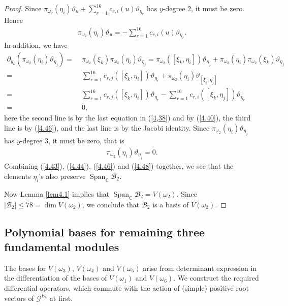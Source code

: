 \documentclass[12pt]{article}
\numberwithin{equation}{section}
\theoremstyle{definition}
\theoremstyle{remark}
\begin{document}
\begin{proof}
    Since $\pi_{\omega_2}(\eta_i)\vartheta_u+\sum_{r=1}^{16}c_{r,i}(u)\vartheta_{\eta_r}$ has $y$-degree $2$, it must be zero. Hence
    \begin{eqnarray}
    	\pi_{\omega_2}(\eta_i)\vartheta_u=-\sum_{r=1}^{16}c_{r,i}(u)\vartheta_{\eta_r}. \label{4.46}
    \end{eqnarray}
    In addition, we have
    \begin{align}
    	\partial_{y_k}(\pi_{\omega_2}(\eta_i)\vartheta_{\eta_j})=&\;\pi_{\omega_2}(\xi_k)\pi_{\omega_2}(\eta_i)\vartheta_{\eta_j}=\pi_{\omega_2}([\xi_k,\eta_i])\vartheta_{\eta_j}+\pi_{\omega_2}(\eta_i)\pi_{\omega_2}(\xi_k)\vartheta_{\eta_j}\nonumber\\
    	=&\;\sum_{r=1}^{16}c_{r,j}([\xi_k,\eta_i])\vartheta_{\eta_r}+\pi_{\omega_2}(\eta_i)\vartheta_{[\xi_k,\eta_j]}\nonumber\\
    	=&\;\sum_{r=1}^{16}c_{r,j}([\xi_k,\eta_i])\vartheta_{\eta_r}-\sum_{r=1}^{16}c_{r,i}([\xi_k,\eta_j])\vartheta_{\eta_r}\nonumber\\
    	=&\;0, 
    \end{align}
    here the second line is by the last equation in (\ref{4,38}) and by (\ref{4.40}), the third line is by (\ref{4.46}), and the last line is by the Jacobi identity. Since $\pi_{\omega_2}(\eta_i)\vartheta_{\eta_j}$ has $y$-degree $3$, it must be zero, that is
    \begin{eqnarray}
    	\pi_{\omega_2}(\eta_i)\vartheta_{\eta_j}=0. \label{4.48}
    \end{eqnarray}
    Combining (\ref{4.43}), (\ref{4.44}), (\ref{4.46}) and (\ref{4.48}) together, we see that the elements $\eta_i$'s also preserve $\operatorname{Span}_{\mathbb{C}}\mathcal{B}_2$. 
    
    Now Lemma \ref{lem4.1} implies that $\operatorname{Span}_{\mathbb{C}}\mathcal{B}_2=V(\omega_2)$. Since $|\mathcal{B}_2|\leqslant 78=\dim V(\omega_2)$, we conclude that $\mathcal{B}_2$ is a basis of $V(\omega_2)$.
\end{proof}    



\subsection{Polynomial bases for remaining three fundamental modules}
The bases for $V(\omega_3)$, $V(\omega_4)$ and $V(\omega_5)$ arise from determinant expression in the differentiation of the bases of $V(\omega_1)$ and $V(\omega_6)$. We construct the required differential operators, which commute with the action of (simple) positive root vectors of $\mathscr{G}^{E_6}$ at first.
\end{document}
